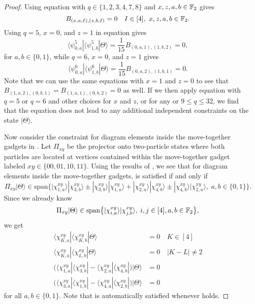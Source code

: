 \documentclass[../thesis-main/thesis-main]{subfiles}
\begin{document}
\begin{proof}
Using equation  with $q\in \{1,2,3,4,7,8\}$ and $x,z,a,b\in\mathbb{F}_2$ gives
\begin{equation}
B_{\left(x,a,I\right),\left(z,b,I\right)}=0\quad I\in[4], ~ x,z,a,b \in\mathbb{F}_2\label{eq:II_constraint}.
\end{equation}
Using $q=5$, $x=0$, and $z=1$ in equation  gives 
\begin{equation}
  \langle \psi_{0,a}^5|\langle{\psi_{1,b}^5}|\Theta\rangle = \frac{1}{15} B_{(0,a,1),(1,b,2)} = 0,\label{eq:constraint_q5}
\end{equation}
for $a,b \in \{0,1\}$, while $q=6$, $x=0$, and $z=1$ gives
\begin{equation}
  \langle \psi_{0,a}^6|\langle{\psi_{1,b}^6}|\Theta\rangle = \frac{1}{15} B_{(0,a,2),(1,b,1)} = 0.\label{eq:constraint_q6}
\end{equation}
Note that we can use the same equations with $x = 1$ and $z=0$ to see that $B_{(1,a,2),(0,b,1)} = B_{(1,a,1),(0,b,2)} = 0$ as well.  If we then  apply equation  with $q=5$ or $q=6$  and other choices for $x$ and $z$, or for any or $9\leq q \leq 32$, we find that the equation does not lead to any additional independent constraints on the state $|\Theta\rangle$.

Now consider the constraint  for diagram elements inside the move-together gadgets in . Let $\Pi_{xy}$ be the projector onto two-particle states where both particles are located at vertices contained within the move-together gadget labeled $xy\in \{00,01,10,11\}$. Using the results of , we see that for diagram elements inside the move-together gadgets,  is satisfied if and only if 
\begin{equation}
\Pi_{xy}|\Theta\rangle\in \mathrm{span}\big\{|\chi_{1,a}^{xy}\rangle|\chi_{3,b}^{xy}\rangle \pm |\chi_{3,b}^{xy}\rangle|\chi_{1,a}^{xy}\rangle  +|\chi_{2,a}^{xy}\rangle|\chi_{4,b}^{xy}\rangle \pm |\chi_{4,b}^{xy}\rangle |\chi_{2,a}^{xy}\rangle, \; a,b\in \{0,1\}\big\}.
\end{equation}
Since we already know
\begin{equation}
\Pi_{xy}|\Theta\rangle\in \mathrm{span}\big\{|\chi_{i,a}^{xy}\rangle|\chi_{j,b}^{xy}\rangle, \; i,j\in [4], a,b\in \mathbb{F}_2\big\},
\end{equation}
we get
\begin{align}
  \langle\chi_{K,a}^{xy}|\langle\chi_{K,b}^{xy}|\Theta\rangle & =0\quad K\in[4]\label{eq:diag_chi_constraint}\\
  \langle\chi_{K,a}^{xy}|\langle\chi_{L,b}^{xy}|\Theta\rangle & =0\quad |K-L| \neq 2\label{eq:off_diag_chi_constraint}\\
  \big(\langle\chi_{1,a}^{xy}|\langle\chi_{3,b}^{xy}|-\langle\chi_{2,a}^{xy}|\langle\chi_{4,b}^{xy}|\big)|\Theta\rangle & =0\label{eq:sum_chi_constraint1}\\
  \big(\langle\chi_{3,a}^{xy}|\langle\chi_{1,b}^{xy}|-\langle\chi_{4,a}^{xy}|\langle\chi_{2,b}^{xy}|\big)|\Theta\rangle & =0\label{eq:sum_chi_constraint2}
\end{align}
for all $a,b\in \{0,1\}$. Note that  is automatically satisfied whenever  holds.  


\end{proof}
\end{document}
